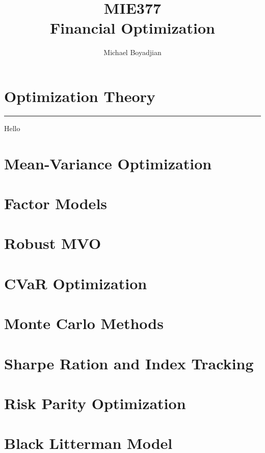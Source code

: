 \documentclass[11pt]{article}
\begin{document}
\title{MIE377  \\ Financial Optimization}
\author{Michael Boyadjian}
\maketitle
\pagebreak

\tableofcontents

\pagebreak

\bigskip
\bigskip
\bigskip


\section{Optimization Theory}
\hrule \vspace{15pt}
Hello
\pagebreak
\section{Mean-Variance Optimization}
\section{Factor Models}
\section{Robust MVO}
\section{CVaR Optimization}
\section{Monte Carlo Methods}
\section{Sharpe Ration and Index Tracking}
\section{Risk Parity Optimization}
\section{Black Litterman Model}
\end{document}
